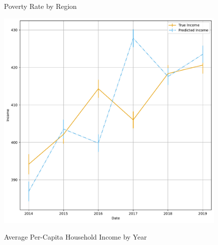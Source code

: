 \begin{figure}[H]
    \centering
    \caption{Poverty Rate by Region}
    \label{fig:enter-label}
\end{figure}



\begin{figure}[H]
    \centering
    \caption{Average Per-Capita  Household Income by Year}
    \includegraphics[width=\textwidth]{../figures/fig5_average_income_time_series.pdf}
    \label{fig:enter-label}
\end{figure}



